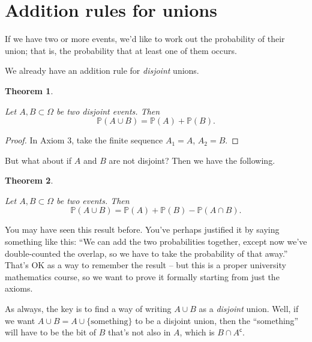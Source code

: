 \documentclass[
  a4paper,
]{book}
\newtheorem{theorem}{Theorem}[chapter]
\theoremstyle{definition}
\theoremstyle{definition}
\theoremstyle{definition}
\theoremstyle{remark}
\begin{document}
\hypertarget{addition}{%
\section{Addition rules for unions}\label{addition}}

If we have two or more events, we'd like to work out the probability of their union; that is, the probability that at least one of them occurs.

We already have an addition rule for \emph{disjoint} unions.

\begin{theorem}
\protect\hypertarget{thm:unlabeled-div-14}{}\label{thm:unlabeled-div-14}

Let \(A, B \subset \Omega\) be two disjoint events. Then
\[ \mathbb P(A \cup B) = \mathbb P(A) + \mathbb P(B) . \]

\end{theorem}

\begin{proof}

In Axiom 3, take the finite sequence \(A_1 = A\), \(A_2 = B\).

\end{proof}

But what about if \(A\) and \(B\) are not disjoint? Then we have the following.

\begin{theorem}
\protect\hypertarget{thm:unlabeled-div-16}{}\label{thm:unlabeled-div-16}

Let \(A, B \subset \Omega\) be two events. Then
\[ \mathbb P(A \cup B) = \mathbb P(A) + \mathbb P(B) - \mathbb P(A \cap B) . \]

\end{theorem}

You may have seen this result before. You've perhaps justified it by saying something like this: ``We can add the two probabilities together, except now we've double-counted the overlap, so we have to take the probability of that away.'' That's OK as a way to remember the result -- but this is a proper university mathematics course, so we want to prove it formally starting from just the axioms.

As always, the key is to find a way of writing \(A \cup B\) as a \emph{disjoint} union. Well, if we want \(A \cup B = A \cup \{\text{something}\}\) to be a disjoint union, then the ``something'' will have to be the bit of \(B\) that's not also in \(A\), which is \(B \cap A^\mathsf{c}\).
\end{document}

